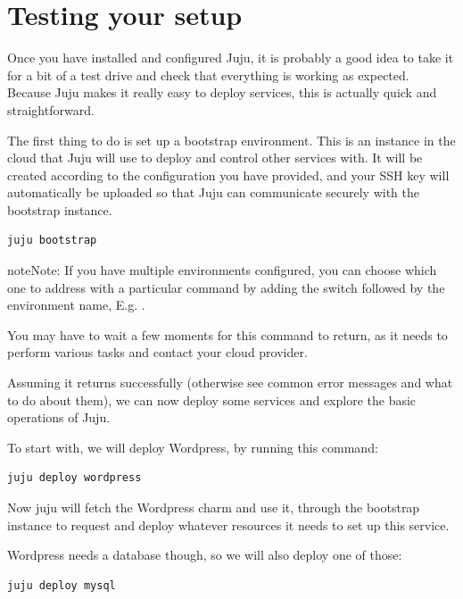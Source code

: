 \documentclass[letterpaper,10pt,english]{sphinxmanual}
\begin{document}
\chapter{Testing your setup}
\label{getting-started:testing-your-setup}
Once you have installed and configured Juju, it is probably a good
idea to take it for a bit of a test drive and check that everything is
working as expected. Because Juju makes it really easy to deploy
services, this is actually quick and straightforward.

The first thing to do is set up a bootstrap environment. This is an
instance in the cloud that Juju will use to deploy and control other
services with. It will be created according to the configuration you
have provided, and your SSH key will automatically be uploaded so that
Juju can communicate securely with the bootstrap instance.

\begin{Verbatim}[commandchars=\\\{\}]
juju bootstrap
\end{Verbatim}

\begin{notice}{note}{Note:}
If you have multiple environments configured, you can choose
which one to address with a particular command by adding the 
switch followed by the environment name, E.g. .
\end{notice}

You may have to wait a few moments for this command to return, as it
needs to perform various tasks and contact your cloud provider.

Assuming it returns successfully (otherwise see common error messages
and what to do about them), we can now deploy some services and
explore the basic operations of Juju.

To start with, we will deploy Wordpress, by running this command:

\begin{Verbatim}[commandchars=\\\{\}]
juju deploy wordpress
\end{Verbatim}

Now juju will fetch the Wordpress charm and use it, through the
bootstrap instance to request and deploy whatever resources it needs
to set up this service.

Wordpress needs a database though, so we will also deploy one of
those:

\begin{Verbatim}[commandchars=\\\{\}]
juju deploy mysql
\end{Verbatim}
\end{document}
